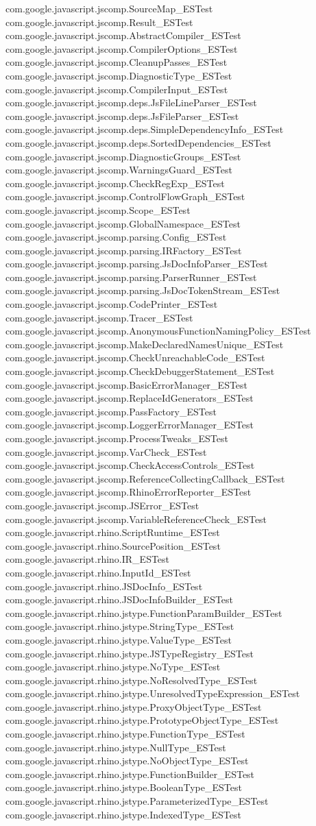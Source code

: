 \documentclass[11pt]{article}
\newenvironment{Shaded}{}{}
\begin{document}
\begin{Shaded}
\begin{Highlighting}[]
com.google.javascript.jscomp.SourceMap_ESTest com.google.javascript.jscomp.Result_ESTest com.google.javascript.jscomp.AbstractCompiler_ESTest com.google.javascript.jscomp.CompilerOptions_ESTest com.google.javascript.jscomp.CleanupPasses_ESTest com.google.javascript.jscomp.DiagnosticType_ESTest com.google.javascript.jscomp.CompilerInput_ESTest com.google.javascript.jscomp.deps.JsFileLineParser_ESTest com.google.javascript.jscomp.deps.JsFileParser_ESTest com.google.javascript.jscomp.deps.SimpleDependencyInfo_ESTest com.google.javascript.jscomp.deps.SortedDependencies_ESTest com.google.javascript.jscomp.DiagnosticGroups_ESTest com.google.javascript.jscomp.WarningsGuard_ESTest com.google.javascript.jscomp.CheckRegExp_ESTest com.google.javascript.jscomp.ControlFlowGraph_ESTest com.google.javascript.jscomp.Scope_ESTest com.google.javascript.jscomp.GlobalNamespace_ESTest com.google.javascript.jscomp.parsing.Config_ESTest com.google.javascript.jscomp.parsing.IRFactory_ESTest com.google.javascript.jscomp.parsing.JsDocInfoParser_ESTest com.google.javascript.jscomp.parsing.ParserRunner_ESTest com.google.javascript.jscomp.parsing.JsDocTokenStream_ESTest com.google.javascript.jscomp.CodePrinter_ESTest com.google.javascript.jscomp.Tracer_ESTest com.google.javascript.jscomp.AnonymousFunctionNamingPolicy_ESTest com.google.javascript.jscomp.MakeDeclaredNamesUnique_ESTest com.google.javascript.jscomp.CheckUnreachableCode_ESTest com.google.javascript.jscomp.CheckDebuggerStatement_ESTest com.google.javascript.jscomp.BasicErrorManager_ESTest com.google.javascript.jscomp.ReplaceIdGenerators_ESTest com.google.javascript.jscomp.PassFactory_ESTest com.google.javascript.jscomp.LoggerErrorManager_ESTest com.google.javascript.jscomp.ProcessTweaks_ESTest com.google.javascript.jscomp.VarCheck_ESTest com.google.javascript.jscomp.CheckAccessControls_ESTest com.google.javascript.jscomp.ReferenceCollectingCallback_ESTest com.google.javascript.jscomp.RhinoErrorReporter_ESTest com.google.javascript.jscomp.JSError_ESTest com.google.javascript.jscomp.VariableReferenceCheck_ESTest com.google.javascript.rhino.ScriptRuntime_ESTest com.google.javascript.rhino.SourcePosition_ESTest com.google.javascript.rhino.IR_ESTest com.google.javascript.rhino.InputId_ESTest com.google.javascript.rhino.JSDocInfo_ESTest com.google.javascript.rhino.JSDocInfoBuilder_ESTest com.google.javascript.rhino.jstype.FunctionParamBuilder_ESTest com.google.javascript.rhino.jstype.StringType_ESTest com.google.javascript.rhino.jstype.ValueType_ESTest com.google.javascript.rhino.jstype.JSTypeRegistry_ESTest com.google.javascript.rhino.jstype.NoType_ESTest com.google.javascript.rhino.jstype.NoResolvedType_ESTest com.google.javascript.rhino.jstype.UnresolvedTypeExpression_ESTest com.google.javascript.rhino.jstype.ProxyObjectType_ESTest com.google.javascript.rhino.jstype.PrototypeObjectType_ESTest com.google.javascript.rhino.jstype.FunctionType_ESTest com.google.javascript.rhino.jstype.NullType_ESTest com.google.javascript.rhino.jstype.NoObjectType_ESTest com.google.javascript.rhino.jstype.FunctionBuilder_ESTest com.google.javascript.rhino.jstype.BooleanType_ESTest com.google.javascript.rhino.jstype.ParameterizedType_ESTest com.google.javascript.rhino.jstype.IndexedType_ESTest 
\end{Highlighting}
\end{Shaded}
\end{document}
